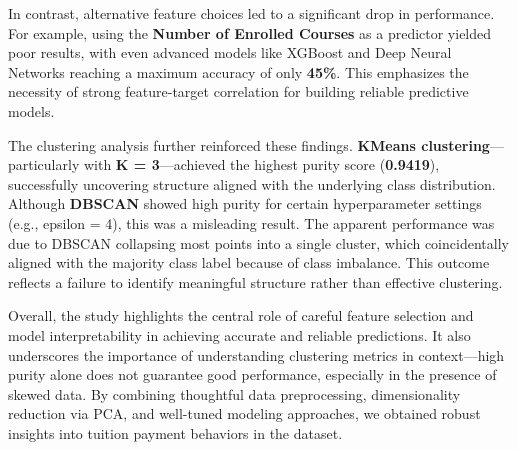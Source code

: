 \documentclass{article}
\begin{document}
In contrast, alternative feature choices led to a significant drop in performance. For example, using the \textbf{Number of Enrolled Courses} as a predictor yielded poor results, with even advanced models like XGBoost and Deep Neural Networks reaching a maximum accuracy of only \textbf{45\%}. This emphasizes the necessity of strong feature-target correlation for building reliable predictive models.

The clustering analysis further reinforced these findings. \textbf{KMeans clustering}—particularly with \textbf{K = 3}—achieved the highest purity score (\textbf{0.9419}), successfully uncovering structure aligned with the underlying class distribution. Although \textbf{DBSCAN} showed high purity for certain hyperparameter settings (e.g., epsilon = 4), this was a misleading result. The apparent performance was due to DBSCAN collapsing most points into a single cluster, which coincidentally aligned with the majority class label because of class imbalance. This outcome reflects a failure to identify meaningful structure rather than effective clustering.

Overall, the study highlights the central role of careful feature selection and model interpretability in achieving accurate and reliable predictions. It also underscores the importance of understanding clustering metrics in context—high purity alone does not guarantee good performance, especially in the presence of skewed data. By combining thoughtful data preprocessing, dimensionality reduction via PCA, and well-tuned modeling approaches, we obtained robust insights into tuition payment behaviors in the dataset.
\end{document}
